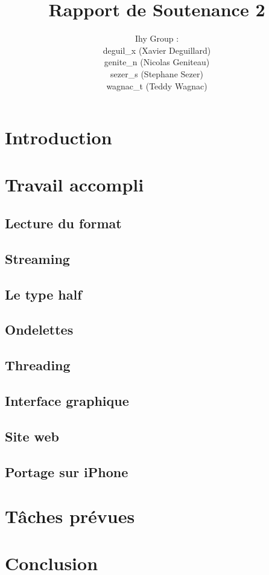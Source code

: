 \documentclass[a4paper,12pt]{article}
\title{Rapport de Soutenance 2}
\author{
Ihy Group : \\
deguil\_x (Xavier Deguillard)\\
genite\_n (Nicolas Geniteau)\\
sezer\_s (Stephane Sezer)\\
wagnac\_t (Teddy Wagnac)
}
\begin{document}
\maketitle

\newpage

\section*{Introduction}

\newpage

\tableofcontents

\newpage

\section{Travail accompli}
	\subsection{Lecture du format}
	\subsection{Streaming}
	\subsection{Le type half}
	\subsection{Ondelettes}
	\subsection{Threading}
	\subsection{Interface graphique}
	\subsection{Site web}
	\subsection{Portage sur iPhone}

\newpage

\section{Tâches prévues}

\newpage

\section*{Conclusion}
\end{document}
